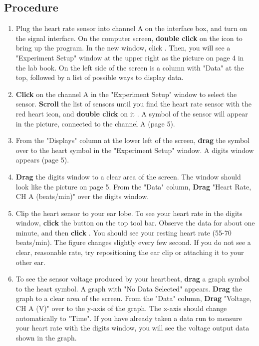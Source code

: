 \documentclass{article}
\begin{document}
\subsection*{Procedure}
\begin{enumerate}
\item Plug the heart rate sensor into channel A on the interface box, and turn on the signal interface. On the computer screen, {\bf double click} on the  icon to bring up the program. In the new window, click . Then, you will see a "Experiment Setup" window at the upper right as the picture on page 4 in the lab book. On the left side of the screen is a column with "Data" at the top, followed by a list of possible ways to display data.

\item {\bf Click} on the channel A in the "Experiment Setup" window to select the sensor. {\bf Scroll} the list of sensors until you find the heart rate sensor with the red heart icon, and {\bf double click} on it . A symbol of the sensor will appear in the picture, connected to the channel A (page 5).

\item From the "Displays" column at the lower left of the screen, {\bf drag} the  symbol over to the heart symbol in the "Experiment Setup" window. A digits window appears (page 5).

\item {\bf Drag} the digits window to a clear area of the screen. The window should look like the picture on page 5. From the "Data" column, {\bf Drag} "Heart Rate, CH A (beats/min)" over the digits window.

\item Clip the heart sensor to your ear lobe. To see your heart rate in the digits window, {\bf click} the  button on the top tool bar. Observe the data for about one minute, and then {\bf click} . You should see your resting heart rate (55-70 beats/min). The figure changes slightly every few second. If you do not see a clear, reasonable rate, try repositioning the ear clip or attaching it to your other ear.  

\item To see the sensor voltage produced by your heartbeat, {\bf drag} a graph symbol to the heart symbol. A graph with "No Data Selected" appears. {\bf Drag} the graph to a clear area of the screen. From the "Data" column, {\bf Drag} "Voltage, CH A (V)" over to the y-axis of the graph. The x-axis should change automatically to "Time". If you have already taken a data run to measure your heart rate with the digits window, you will see the voltage output data shown in the graph.


\end{enumerate}
\end{document}
